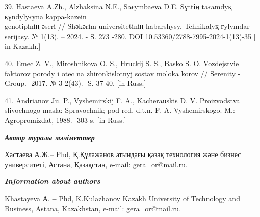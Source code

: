 \begin{noparindent}
39. Hastaeva A.Zh., Al\textquotesingle zhaksina N.E., Saғymbaeva D.E.
Sүttің taғamdyқ құndylyғyna kappa-kazein \\genotipіnің әserі // Shәkәrіm
universitetіnің habarshysy. Tehnikalyқ ғylymdar serijasy. № 1(13). --
2024. - S. 273 -280. DOI 10.53360/2788-7995-2024-1(13)-35 {[} in
Kazakh.{]}

40. Emec Z. V., Miroshnikova O. S., Hruckij S. S., Basko S. O.
Vozdejstvie faktorov porody i otec na zhironkislotnyj sostav moloka
korov // Serenity -Group.- 2017.-№ 3-2(43).- S. 37-40. {[}in Russ.{]}

41. Andrianov Ju. P., Vyshemirskij F. A., Kacherauskis D. V.
Proizvodstva slivochnogo masla: Spravochnik; pod red. d.t.n. F. A.
Vyshemirskogo.-M.: Agropromizdat, 1988. -303 s. {[}in Russ.{]}



\end{noparindent}

\emph{{\bfseries Автор туралы мәліметтер}}

\begin{noparindent}

Хастаева А.Ж.-- Phd, Қ.Құлажанов атындағы қазақ технология және бизнес
университеті, Астана, Қазақстан, e-mail: gera\_or@mail.ru.

\end{noparindent}

\emph{{\bfseries Information about authors}}

\begin{noparindent}

Khastayeva А. {\bfseries --} Phd, K.Kulazhanov Kazakh University of
Technology and Business, Astana, Kazakhstan, e-mail: gera\_or@mail.ru.

\end{noparindent}




